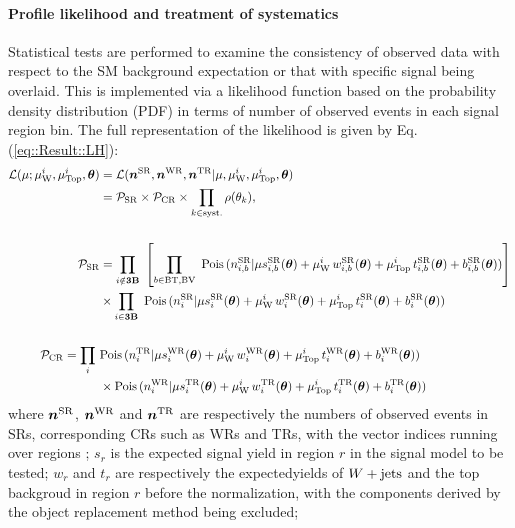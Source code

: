 \paragraph{Profile likelihood and treatment of systematics} 
Statistical tests are performed to examine the consistency of observed data with respect to the SM background expectation or that with specific signal being overlaid. 
This is implemented via a likelihood function based on the probability density distribution (PDF) in terms of number of observed events in each signal region bin. 
The full representation of the likelihood is given by Eq. (\ref{eq::Result::LH}):
\begin{align}
 \mathcal{L} (\mu; \muw, \mutop, \bmtheta)  
 & =  \mathcal{L} ( \bm{n}^{\SR}, \bm{n}^{\WR}, \bm{n}^{\TR} | \mu, \muw, \mutop, \bmtheta) \nn \\
  & = \mathcal{P}_{\SR} \times \mathcal{P}_{\CR}  \times \prod_{k\in \mathrm{syst.}} \rho(\theta_k), \nn \\
& \nn \\
% 
  \mathcal{P}_{\SR} & = \prod_{i\notin \textbf{3B}} \,\, \left[ \prod_{b \in \mathrm{BT}, \mathrm{BV}} \,\, \mathrm{Pois}\, (n^{\SR}_{i,b} | \mu s^{\SR}_{i,b}(\bmtheta) + \muw \,  w^{\SR}_{i,b}(\bmtheta) + \mutop \,  t^{\SR}_{i,b}(\bmtheta) + b^{\SR}_{i,b}(\bmtheta)) \right] \nn \\
& \times \prod_{i\in \textbf{3B}} \,\, \mathrm{Pois}\, (n^{\SR}_i | \mu s^{\SR}_i(\bmtheta) + \muw \,  w^{\SR}_i(\bmtheta) + \mutop \,  t^{\SR}_i(\bmtheta) + b^{\SR}_i(\bmtheta))  \nn \\
& \nn\\
%
  \mathcal{P}_{\CR} =  \prod_i \,\,
  &        \mathrm{Pois}\, (n^{\TR}_i | \mu s^{\WR}_i(\bmtheta) + \muw \,  w^{\WR}_i(\bmtheta) + \mutop \,  t^{\WR}_i(\bmtheta) + b^{\WR}_i(\bmtheta))  \nn \\
  & \times \mathrm{Pois}\, (n^{\WR}_i | \mu s^{\TR}_i(\bmtheta) + \muw \,  w^{\TR}_i(\bmtheta) + \mutop \,  t^{\TR}_i(\bmtheta) + b^{\TR}_i(\bmtheta))   
\label{eq::Result::LH}
\end{align}
where $\bm{n}^{\mathrm{SR}}$, $\bm{n}^{\mathrm{WR}}$ and $\bm{n}^{\mathrm{TR}}$ are respectively the numbers of observed events in SRs, corresponding CRs such as WRs and TRs, with the vector indices running over regions ;
$s_{r}$ is the expected signal yield in region $r$ in the signal model to be tested;
$w_{r}$ and $t_{r}$ are respectively the expectedyields of $W+\mathrm{jets}$ and the top backgroud in region $r$ before the normalization, with the components derived by the object replacement method being excluded;
